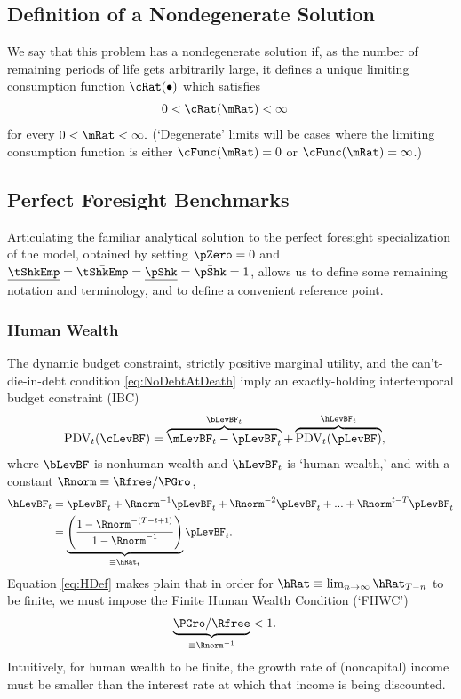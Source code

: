 \documentclass[BufferStockTheory]{subfiles}
\begin{document}
\hypertarget{Definition-of-a-Nondegenerate-Solution}{}
\subsection{Definition of a Nondegenerate Solution}

We say that this problem has a nondegenerate solution if, as the number of remaining periods of life gets arbitrarily large, it
defines a unique limiting consumption function $\cRat(\bullet)$ which satisfies
\begin{align}
  0 & < \cRat(\mRat) <  \infty 
\end{align}
for every $0 < \mRat < \infty.$ (`Degenerate' limits will be cases
where the limiting consumption function is either $\cFunc(\mRat)=0$ or $\cFunc(\mRat)=\infty$.)

\hypertarget{Perfect-Foresight-Benchmarks}{}
\subsection{Perfect Foresight Benchmarks}

Articulating the familiar analytical solution to the perfect foresight specialization of the model, obtained by setting $\pZero=0$ and $\ushort{\tShkEmp}=\bar{\tShkEmp}=\ushort{\pShk}=\bar{\pShk}=1$, allows us to define some remaining notation and terminology, and to define a convenient reference point.

\hypertarget{Human-Wealth}{}
\subsubsection{Human Wealth}
The dynamic budget constraint, strictly positive marginal utility, and the can't-die-in-debt condition \eqref{eq:NoDebtAtDeath} imply an exactly-holding intertemporal budget constraint (IBC)
\begin{align}
  \text{PDV}_{t}(\cLevBF)  & = \overbrace{\mLevBF_{t}-\pLevBF_{t}}^{\bLevBF_{t}}+\overbrace{\text{PDV}_{t}(\pLevBF)}^{\hLevBF_{t}}, \label{eq:IBCFinite}
\end{align}
where $\bLevBF$ is nonhuman wealth and $\hLevBF_{t}$ is `human wealth,' and with a constant $\Rnorm \equiv \Rfree/\PGro$,
\begin{align}
  \hLevBF_{t}  & = \pLevBF_{t}+\Rnorm^{-1} \pLevBF_{t} + \Rnorm^{-2} \pLevBF_{t} + ... + \Rnorm^{t-T} \pLevBF_{t} \notag
  \\  & = \underbrace{\left(\frac{1-\Rnorm^{-(T-t+1)}}{1-\Rnorm^{-1}}\right)}_{\equiv \hRat_{t}}\pLevBF_{t} \label{eq:HDef}.
\end{align}
Equation \eqref{eq:HDef} makes plain that in order for $\hRat \equiv \lim_{n \rightarrow
  \infty} \hRat_{T-n}$ to be finite, we must
impose the Finite Human Wealth Condition (`FHWC') \hypertarget{FHWC}{}
\begin{align}
  \underbrace{\PGro/\Rfree}_{\equiv \Rnorm^{-1}}  & < 1 \label{eq:FHWC}.
\end{align}
Intuitively, for human wealth to be finite, the growth rate of (noncapital) income must be smaller than
the interest rate at which that income is being discounted.
\end{document}
